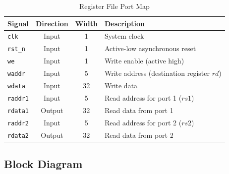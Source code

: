 \documentclass[12pt,a4paper]{article}
\begin{document}
\begin{table}[H]
    \centering
    \begin{tabularx}{\textwidth}{@{} l c c X @{}}
        \toprule
        \textbf{Signal} & \textbf{Direction} & \textbf{Width} & \textbf{Description} \\
        \midrule
        \texttt{clk}    & Input  & 1  & System clock \\
        \texttt{rst\_n} & Input  & 1  & Active-low asynchronous reset \\
        \texttt{we}     & Input  & 1  & Write enable (active high) \\
        \texttt{waddr}  & Input  & 5  & Write address (destination register $rd$) \\
        \texttt{wdata}  & Input  & 32 & Write data \\
        \texttt{raddr1} & Input  & 5  & Read address for port 1 ($rs1$) \\
        \texttt{rdata1} & Output & 32 & Read data from port 1 \\
        \texttt{raddr2} & Input  & 5  & Read address for port 2 ($rs2$) \\
        \texttt{rdata2} & Output & 32 & Read data from port 2 \\
        \bottomrule
    \end{tabularx}
    \caption{Register File Port Map}
\end{table}

\subsection{Block Diagram}
\end{document}
